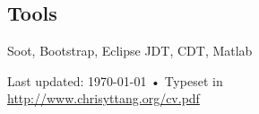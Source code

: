\documentclass[10pt, a4paper]{article}
\begin{document}
\subsection{Tools} Soot, Bootstrap, Eclipse JDT, CDT, Matlab



\vfill{}

\begin{center}
{\scriptsize  Last updated: \today\- •\- 
Typeset in \href{http://nitens.org/taraborelli/cvtex}{
\XeTeX }\\
\href{http://www.chrisyttang.org/cv.pdf}{http://www.chrisyttang.org/cv.pdf}}
\end{center}
\end{document}
